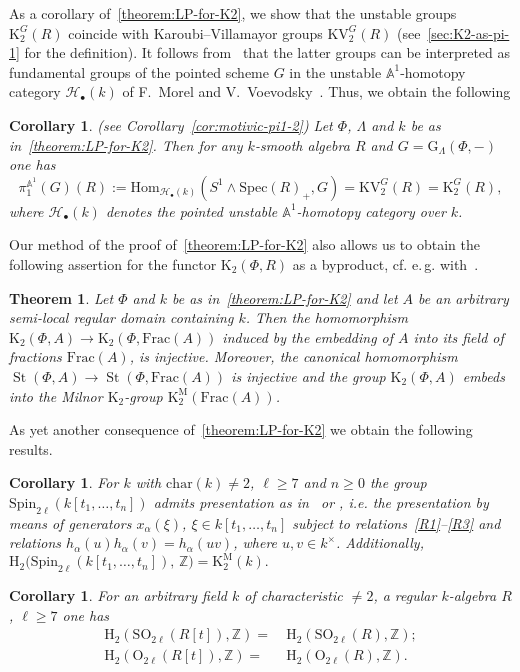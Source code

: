 \documentclass[oneside, 11pt]{amsart}
\numberwithin{equation}{section}
\newtheorem{theorem}[lemma]{Theorem}
\newtheorem{corollary}[lemma]{Corollary}
\newcommand{\K}{{\mathrm{K}}}
\newcommand{\St}{\mathop{\mathrm{St}}\nolimits}
\theoremstyle{definition}
\theoremstyle{definition}
\theoremstyle{remark}
\newcommand{\ZZ}{\mathbb{Z}}
\begin{document}
As a corollary of~\cref{theorem:LP-for-K2}, we show that the unstable groups $\K_2^G(R)$ coincide with Karoubi--Villamayor groups $\mathrm{KV}_2^G(R)$ (see~\cref{sec:K2-as-pi-1} for the definition). It follows from~\cite{AHW18} that the latter groups can be interpreted as fundamental groups of the pointed scheme $G$ in the unstable $\mathbb{A}^1$-homotopy category $\mathscr{H}_\bullet(k)$ of F.~Morel and V.~Voevodsky~\cite{MV99}. Thus, we obtain the following

\begin{corollary} \label{cor:motivic-pi1} (see Corollary~\ref{cor:motivic-pi1-2}) Let $\Phi$, $\Lambda$ and $k$ be as in~\cref{theorem:LP-for-K2}. Then for any $k$-smooth algebra $R$ and $G = \mathrm{G}_{\Lambda}(\Phi, -)$ one has
\[ \pi_1^{\mathbb{A}^1}(G)(R) := \mathrm{Hom}_{\mathscr{H}_{\bullet}(k)}(S^1 \wedge \mathrm{Spec}(R)_+, G) = \mathrm{KV}_2^{G}(R) = \K_2^G(R),\]
where $\mathscr{H}_\bullet(k)$ denotes the pointed unstable $\mathbb{A}^1$-homotopy category over $k$.
\end{corollary}

Our method of the proof of~\cref{theorem:LP-for-K2} also allows us to obtain the following assertion for the functor $\K_2(\Phi, R)$ as a byproduct, cf. e.\,g. with~\cite[Theorem~1.2]{Sta20}.
\begin{theorem} \label{theorem:Gersten} Let $\Phi$ and $k$ be as in~\cref{theorem:LP-for-K2} and let $A$ be an arbitrary semi-local regular domain containing $k$. Then the homomorphism $\K_2(\Phi, A) \to \K_2(\Phi, \mathrm{Frac}(A))$ induced by the embedding of $A$ into its field of fractions $\mathrm{Frac}(A)$, is injective. Moreover, the canonical homomorphism $\St(\Phi, A) \to \St(\Phi, \mathrm{Frac}(A))$ is injective and the group $\K_2(\Phi, A)$ embeds into the Milnor $\K_2$-group $\K_2^\mathrm{M}(\mathrm{Frac}(A))$. \end{theorem}


As yet another consequence of~\cref{theorem:LP-for-K2} we obtain the following results.
\begin{corollary} \label{cor:various-facts}
For $k$ with $\mathrm{char}(k)\neq 2$, $\ell \geq 7$ and $n\geq 0$ the group $\mathrm{Spin}_{2\ell}(k[t_1,\ldots, t_n])$ admits presentation as in~\cite[\S~6]{St67} or \cite[\S~5]{Ma69}, i.e. the presentation by means of generators $x_\alpha(\xi)$, $\xi \in k[t_1,\ldots, t_n]$ subject to relations~\eqref{R1}--\eqref{R3} and relations $h_\alpha(u)h_\alpha(v) = h_\alpha(uv)$, where $u, v\in k^\times$. Additionally, $\mathrm H_2(\mathrm{Spin}_{2\ell}(k[t_1,\ldots,t_n]),\,\mathbb Z\big) = \K^\mathrm{M}_2(k).$
\end{corollary}
\begin{corollary} \label{cor:H_2-O}
 For an arbitrary field $k$ of characteristic $\neq 2$, a regular $k$-algebra $R$, $\ell \geq 7$ one has
 \begin{align}
  \mathrm H_2 (\mathrm{SO}_{2\ell}(R[t]), \ZZ) =&\ \mathrm H_2 (\mathrm{SO}_{2\ell}(R), \ZZ); \label{eq:H_2-SO} \\
  \mathrm H_2 (\mathrm{O}_{2\ell}(R[t]), \ZZ) =&\ \mathrm H_2 (\mathrm{O}_{2\ell}(R), \ZZ). \label{eq:H_2-O}
 \end{align}
\end{corollary}
\end{document}
